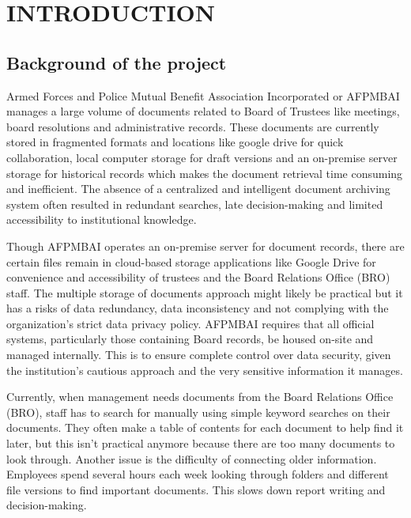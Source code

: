 \section{INTRODUCTION}
    \subsection{Background of the project}
            Armed Forces and Police Mutual Benefit Association Incorporated or AFPMBAI manages a large volume of documents related to Board of Trustees like meetings, board resolutions and administrative records. These documents are currently stored in fragmented formats and locations like google drive for quick collaboration, local computer storage for draft versions and an on-premise server storage for historical records which makes the document retrieval time consuming and inefficient. The absence of a centralized and intelligent document archiving system often resulted in redundant searches, late decision-making and limited accessibility to institutional knowledge.

Though AFPMBAI operates an on-premise server for document records, there are certain files remain in cloud-based storage applications like Google Drive for convenience and accessibility of trustees and the Board Relations Office (BRO) staff. The multiple storage of documents approach might likely be practical but it has a risks of data redundancy, data inconsistency and not complying with the organization’s strict data privacy policy. AFPMBAI requires that all official systems, particularly those containing Board records, be housed on-site and managed internally. This is to ensure complete control over data security, given the institution's cautious approach and the very sensitive information it manages.

Currently, when management needs documents from the Board Relations Office (BRO), staff has to search for manually using simple keyword searches on their documents. They often make a table of contents for each document to help find it later, but this isn't practical anymore because there are too many documents to look through. Another issue is the difficulty of connecting older information. Employees spend several hours each week looking through folders and different file versions to find important documents. This slows down report writing and decision-making. 

